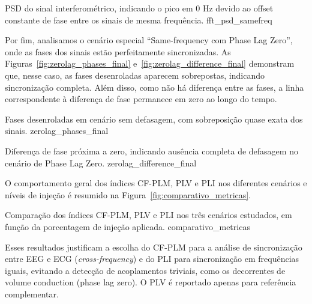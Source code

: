 \begin{itemize}
{PSD do sinal interferométrico, indicando o pico em 0 Hz devido ao offset constante de fase entre os sinais de mesma frequência.}
{fft_psd_samefreq}

Por fim, analisamos o cenário especial \textquotedblleft Same-frequency com Phase Lag Zero\textquotedblright, onde as fases dos sinais estão perfeitamente sincronizadas. As Figuras~\ref{fig:zerolag_phases_final} e~\ref{fig:zerolag_difference_final} demonstram que, nesse caso, as fases desenroladas aparecem sobrepostas, indicando sincronização completa. Além disso, como não há diferença entre as fases, a linha correspondente à diferença de fase permanece em zero ao longo do tempo.

{Fases desenroladas em cenário sem defasagem, com sobreposição quase exata dos sinais.}
{zerolag_phases_final}

{Diferença de fase próxima a zero, indicando ausência completa de defasagem no cenário de Phase Lag Zero.}
{zerolag_difference_final}


O comportamento geral dos índices CF-PLM, PLV e PLI nos diferentes cenários e níveis de injeção é resumido na Figura~\ref{fig:comparativo_metricas}.

{Comparação dos índices CF-PLM, PLV e PLI nos três cenários estudados, em função da porcentagem de injeção aplicada.}
{comparativo_metricas}

Esses resultados justificam a escolha do CF-PLM para a análise de sincronização entre EEG e ECG (\textit{cross-frequency}) e do PLI para sincronização em frequências iguais, evitando a detecção de acoplamentos triviais, como os decorrentes de volume conduction (phase lag zero). O PLV é reportado apenas para referência complementar.


\end{itemize}

